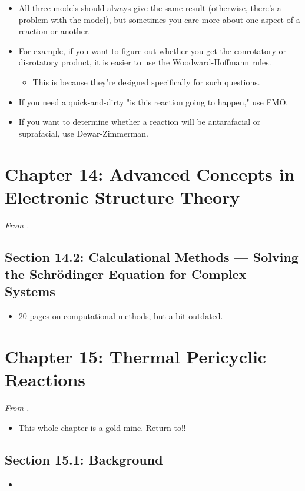 \documentclass[../notes.tex]{subfiles}
\begin{document}
\begin{itemize}
\begin{itemize}
        \item All three models should always give the same result (otherwise, there's a problem with the model), but sometimes you care more about one aspect of a reaction or another.
        \item For example, if you want to figure out whether you get the conrotatory or disrotatory product, it is easier to use the Woodward-Hoffmann rules.
        \begin{itemize}
            \item This is because they're designed specifically for such questions.
        \end{itemize}
        \item If you need a quick-and-dirty "is this reaction going to happen," use FMO.
        \item If you want to determine whether a reaction will be antarafacial or suprafacial, use Dewar-Zimmerman.
    \end{itemize}
\end{itemize}



\section{Chapter 14: Advanced Concepts in Electronic Structure Theory}
\emph{From \textcite{bib:Anslyn}.}
\subsection*{Section 14.2: Calculational Methods --- Solving the Schr\"{o}dinger Equation for Complex Systems}
\begin{itemize}
    \item {}20 pages on computational methods, but a bit outdated.
\end{itemize}



\section{Chapter 15: Thermal Pericyclic Reactions}
\emph{From \textcite{bib:Anslyn}.}
\begin{itemize}
    \item This whole chapter is a gold mine. Return to!!
\end{itemize}


\subsection*{Section 15.1: Background}
\begin{itemize}
    \item 
\end{itemize}
\end{document}
